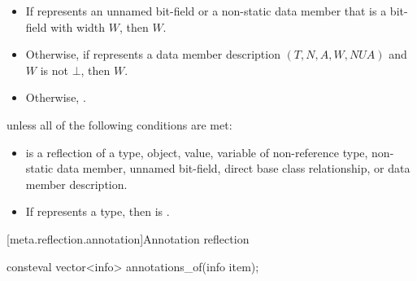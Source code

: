 \begin{itemdescr}
\pnum
\returns
\begin{itemize}
\item
  If  represents
  an unnamed bit-field
  or a non-static data member that is a bit-field
  with width $W$,
  then $W$.
\item
  Otherwise, if  represents a data member description
  $(T, N, A, W, \mathit{NUA})$
  and $W$ is not $\bot$,
  then $W$.
\item
  Otherwise, .
\end{itemize}

\pnum
\throws
{} unless
all of the following conditions are met:
\begin{itemize}
\item
{} is a reflection of a
type,
object,
value,
variable of non-reference type,
non-static data member,
unnamed bit-field,
direct base class relationship, or
data member description.
\item
If  represents a type,
then  is .
\end{itemize}
\end{itemdescr}

[meta.reflection.annotation]{Annotation reflection}

%
\begin{itemdecl}
consteval vector<info> annotations_of(info item);
\end{itemdecl}

